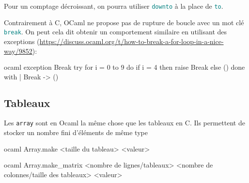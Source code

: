 \documentclass{scrartcl}
\begin{document}
			\rem Pour un comptage décroissant, on pourra utiliser \textcolor{teal}{\texttt{downto}} à la place de \textcolor{teal}{\texttt{to}}.

			\rem Contrairement à C, OCaml ne propose pas de rupture de boucle avec un mot clé \textcolor{teal}{\texttt{break}}. 
			On peut cela dit obtenir un comportement similaire en utilisant des exceptions (\url{https://discuss.ocaml.org/t/how-to-break-a-for-loop-in-a-nice-way/9852}):
			\begin{code}{ocaml}
				exception Break
				try
					for i = 0 to 9 do
						if i = 4 then raise Break
						else ()
					done
				with
				| Break -> ()
			\end{code}

		\subsection{Tableaux}
			Les \texttt{array} sont en Ocaml la même chose que les tableaux en C. Ils permettent de stocker un nombre fini d'éléments de même type
			\begin{code}{ocaml}
				Array.make <taille du tableau> <valeur>
			\end{code}

			\begin{code}{ocaml}
				Array.make_matrix <nombre de lignes/tableaux> <nombre de colonnes/taille des tableaux> <valeur>
			\end{code}
\end{document}
